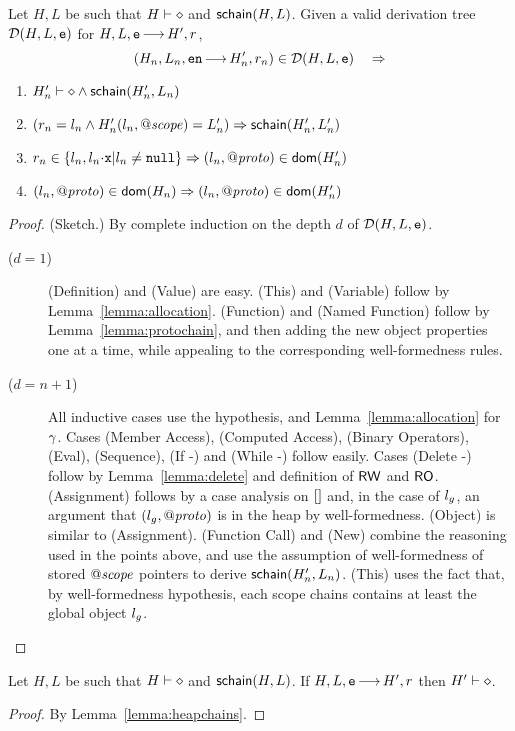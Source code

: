 \documentclass{article}
\begin{document}
%
\begin{lemma}
        \label{lemma:heapchains}
%
Let $H,L$ be such that $H\vdash\diamond$ and $\mathsf{schain}(H,L)$. 
%
Given a valid derivation tree $\mathcal{D}(H,L,\mbox{\texttt{{\upshape e}}})$ for $H,L,\mbox{\texttt{{\upshape e}}}{\,\longrightarrow\,} H',r$, 
%
\[(H_n,L_n,\mbox{\texttt{{\upshape en}}}{\,\longrightarrow\,} H_n',r_n)\in\mathcal{D}(H,L,\mbox{\texttt{{\upshape e}}})\quad\Rightarrow\]
%
\begin{enumerate}
\item $H_n'\vdash\diamond\wedge \mathsf{schain}(H_n',L_n)$
\item $(r_n=l_n\wedge H_n'(l_n,\mathit{@scope})=L_n') \Rightarrow \mathsf{schain}(H_n',L_n')$
\item $\njs{r_n}\in\{l_n,l_n\sv\js{x}|l_n\neq\nil\} \Rightarrow (l_n,\protop)\in\domain(H_n')$
\item $(l_n,\mathit{@proto})\in\mathsf{dom}(H_n)\Rightarrow (l_n,\mathit{@proto})\in\mathsf{dom}(H_n')$
\end{enumerate}
%
\end{lemma}
%
\begin{proof} (Sketch.)
By complete induction on the depth $d$ of $\mathcal{D}(H,L,\mbox{\texttt{{\upshape e}}})$. 
%
\begin{description}
%
\item[($d=1$)] 
%
(Definition) and (Value) are easy. 
%
(This) and (Variable) follow by Lemma~\ref{lemma:allocation}. 
%
(Function) and (Named Function) follow by Lemma~\ref{lemma:protochain}, and then adding the new object properties one at a time, while appealing to the corresponding well-formedness rules.
%
\item[($d=n+1$)]  
%
All inductive cases use the hypothesis, and  Lemma~\ref{lemma:allocation} for $\gamma$.
%
Cases (Member Access), (Computed Access), (Binary Operators), (Eval), (Sequence), (If -) and (While -) follow easily.
%
Cases (Delete -) follow by Lemma~\ref{lemma:delete} and definition of $\mathsf{RW}$ and $\mathsf{RO}$.
%
(Assignment) follows by a case analysis on ${[]}$ and, in the case of $l_g$, an argument that $(l_g,\mathit{@proto})$ is in the heap by well-formedness.
%
(Object) is similar to (Assignment).
%
(Function Call) and (New) combine the reasoning used in the points above, and use the assumption of well-formedness of stored $\mathit{@scope}$ pointers to derive $\mathsf{schain}(H_n',L_n)$. 
%
(This) uses the fact that, by well-formedness hypothesis, each scope chains contains at least the global object $l_g$.
%
\end{description}
%
\end{proof}



  \begin{thm}\label{thoerem:wfheap}
  Let $H,L$ be such that $H\vdash\diamond$ and $\mathsf{schain}(H,L)$. 
  If $H,L,\mbox{\texttt{{\upshape e}}}{\,\longrightarrow\,} H',r$ then $H'\vdash\diamond$. 
  \end{thm}
  \begin{proof}
  By Lemma~\ref{lemma:heapchains}.
  \end{proof}
\end{document}
